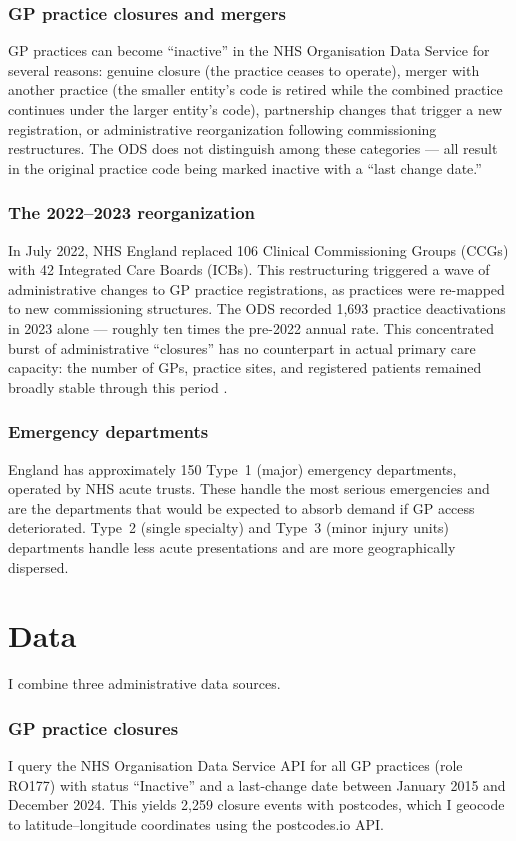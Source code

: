 \documentclass[12pt]{article}
\begin{document}
\subsubsection*{GP practice closures and mergers} GP practices can become ``inactive'' in the NHS Organisation Data Service for several reasons: genuine closure (the practice ceases to operate), merger with another practice (the smaller entity's code is retired while the combined practice continues under the larger entity's code), partnership changes that trigger a new registration, or administrative reorganization following commissioning restructures. The ODS does not distinguish among these categories --- all result in the original practice code being marked inactive with a ``last change date.''

\subsubsection*{The 2022--2023 reorganization} In July 2022, NHS England replaced 106 Clinical Commissioning Groups (CCGs) with 42 Integrated Care Boards (ICBs). This restructuring triggered a wave of administrative changes to GP practice registrations, as practices were re-mapped to new commissioning structures. The ODS recorded 1,693 practice deactivations in 2023 alone --- roughly ten times the pre-2022 annual rate. This concentrated burst of administrative ``closures'' has no counterpart in actual primary care capacity: the number of GPs, practice sites, and registered patients remained broadly stable through this period \citep{NHSDigital2024}.

\subsubsection*{Emergency departments} England has approximately 150 Type~1 (major) emergency departments, operated by NHS acute trusts. These handle the most serious emergencies and are the departments that would be expected to absorb demand if GP access deteriorated. Type~2 (single specialty) and Type~3 (minor injury units) departments handle less acute presentations and are more geographically dispersed.

\section{Data}
\label{sec:data}

I combine three administrative data sources.

\subsubsection*{GP practice closures} I query the NHS Organisation Data Service API for all GP practices (role RO177) with status ``Inactive'' and a last-change date between January 2015 and December 2024. This yields 2,259 closure events with postcodes, which I geocode to latitude--longitude coordinates using the postcodes.io API.
\end{document}

